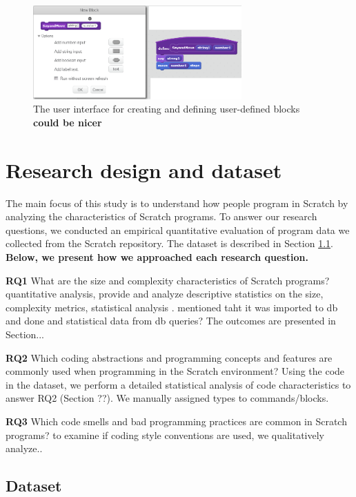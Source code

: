 \documentclass{sig-alternate}
\newcommand{\todo}[1]{\textbf{#1}}
\begin{document}
\begin{figure}
	\begin{center}
		\includegraphics[width=8cm]{fig/twoBlocks.png}
		\caption{The user interface for creating and defining user-defined blocks \todo{could be nicer}}
		\label{fig:twoBlocks}
	\end{center}
\end{figure} 



\section{Research design and dataset}
\label{researchDesign}

The main focus of this study is to understand how people program in Scratch by analyzing the characteristics of Scratch programs. To answer our research questions, we conducted an empirical quantitative evaluation of program data we collected from the Scratch repository. The dataset is described in Section \ref{dataset}. \todo{Below, we present how we approached each research question.}

\textbf{RQ1} What are the size and complexity characteristics of Scratch programs? quantitative analysis, provide and analyze descriptive statistics on the size, complexity metrics, statistical analysis . mentioned taht it was imported to db and done and statistical data from db queries? The outcomes are presented in Section...

\textbf{RQ2} Which coding abstractions and programming concepts and features are commonly used when programming in the Scratch environment? Using the code in the dataset, we perform a detailed statistical analysis of code characteristics to answer RQ2 (Section ??). We manually assigned types to commands/blocks.

\textbf{RQ3} Which code smells and bad programming practices are common in Scratch programs?  to examine if coding style conventions are used, we qualitatively analyze..

\subsection{Dataset}
\label{dataset}
\end{document}
